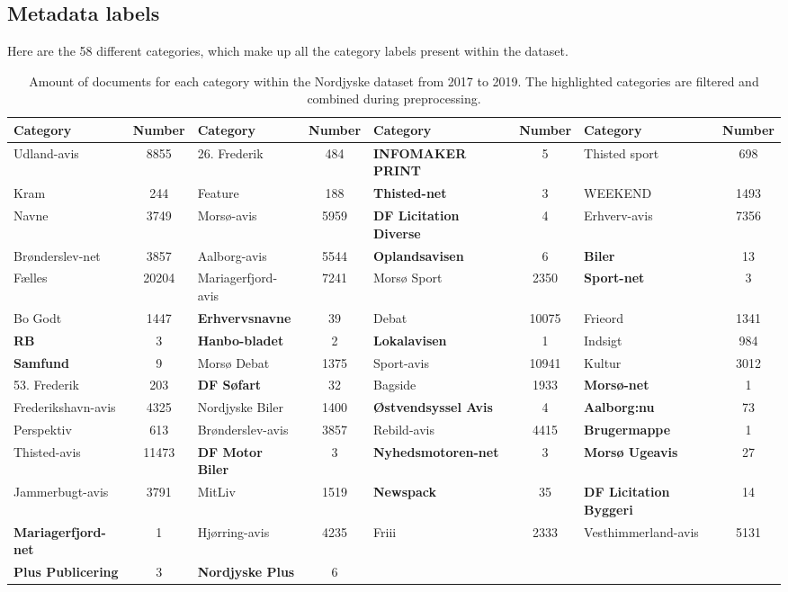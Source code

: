 \subsection{Metadata labels}\label{sec:appendix_meta_data}
Here are the 58 different categories, which make up all the category labels present within the dataset.

\begin{table*}[h]
	\centering
	\begin{tabular}{l|c|l|c|l|c|l|c}
		Category & Number & Category & Number & Category & Number & Category & Number \\
 		\toprule
		Udland-avis & 8855 & 26. Frederik & 484 & \textbf{INFOMAKER PRINT} & 5 & Thisted sport & 698\\
		Kram & 244 & Feature & 188 & \textbf{Thisted-net} & 3 & WEEKEND & 1493\\
		Navne & 3749 & Morsø-avis & 5959 & \textbf{DF Licitation Diverse} & 4 & Erhverv-avis & 7356\\
		Brønderslev-net & 3857 & Aalborg-avis & 5544 & \textbf{Oplandsavisen} & 6 & \textbf{Biler} & 13\\
		Fælles & 20204 & Mariagerfjord-avis & 7241 & Morsø Sport & 2350 & \textbf{Sport-net} & 3\\
		Bo Godt & 1447 & \textbf{Erhvervsnavne} & 39 & Debat & 10075 & Frieord & 1341\\
		\textbf{RB} & 3 & \textbf{Hanbo-bladet} & 2 & \textbf{Lokalavisen} & 1 & Indsigt & 984\\
		\textbf{Samfund} & 9 & Morsø Debat & 1375 & Sport-avis & 10941 & Kultur & 3012 \\
		53. Frederik & 203 & \textbf{DF Søfart} & 32 & Bagside & 1933 & \textbf{Morsø-net} & 1 \\
		Frederikshavn-avis & 4325 & Nordjyske Biler & 1400 & \textbf{Østvendsyssel Avis} & 4 & \textbf{Aalborg:nu} & 73\\
		Perspektiv & 613 & Brønderslev-avis & 3857 & Rebild-avis & 4415 & \textbf{Brugermappe} & 1\\
		Thisted-avis & 11473 & \textbf{DF Motor Biler} & 3 & \textbf{Nyhedsmotoren-net} & 3 & \textbf{Morsø Ugeavis} & 27\\
		Jammerbugt-avis & 3791 & MitLiv & 1519 & \textbf{Newspack} & 35 & \textbf{DF Licitation Byggeri} & 14\\
		\textbf{Mariagerfjord-net} & 1 & Hjørring-avis & 4235 & Friii & 2333 & Vesthimmerland-avis & 5131\\
		\textbf{Plus Publicering} & 3 & \textbf{Nordjyske Plus} & 6 & & & & \\
		\bottomrule
	\end{tabular}
	\caption{Amount of documents for each category within the Nordjyske dataset from 2017 to 2019.
	The highlighted categories are filtered and combined during preprocessing.}
	\label{tab:category_table}
\end{table*}

